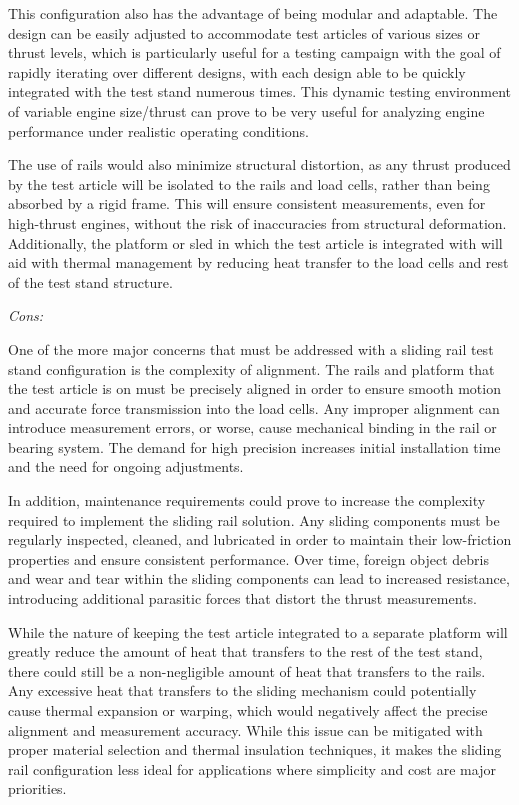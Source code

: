 This configuration also has the advantage of being modular and adaptable. The design can be easily adjusted to accommodate test articles of various sizes or thrust levels, which is particularly useful for a testing campaign with the goal of rapidly iterating over different designs, with each design able to be quickly integrated with the test stand numerous times. This dynamic testing environment of variable engine size/thrust can prove to be very useful for analyzing engine performance under realistic operating conditions.

The use of rails would also minimize structural distortion, as any thrust produced by the test article will be isolated to the rails and load cells, rather than being absorbed by a rigid frame. This will ensure consistent measurements, even for high-thrust engines, without the risk of inaccuracies from structural deformation. Additionally, the platform or sled in which the test article is integrated with will aid with thermal management by reducing heat transfer to the load cells and rest of the test stand structure.

\noindent\textit{Cons:}

One of the more major concerns that must be addressed with a sliding rail test stand configuration is the complexity of alignment. The rails and platform that the test article is on must be precisely aligned in order to ensure smooth motion and accurate force transmission into the load cells. Any improper alignment can introduce measurement errors, or worse, cause mechanical binding in the rail or bearing system. The demand for high precision increases initial installation time and the need for ongoing adjustments.

In addition, maintenance requirements could prove to increase the complexity required to implement the sliding rail solution. Any sliding components must be regularly inspected, cleaned, and lubricated in order to maintain their low-friction properties and ensure consistent performance. Over time, foreign object debris and wear and tear within the sliding components can lead to increased resistance, introducing additional parasitic forces that distort the thrust measurements.

While the nature of keeping the test article integrated to a separate platform will greatly reduce the amount of heat that transfers to the rest of the test stand, there could still be a non-negligible amount of heat that transfers to the rails. Any excessive heat that transfers to the sliding mechanism could potentially cause thermal expansion or warping, which would negatively affect the precise alignment and measurement accuracy. While this issue can be mitigated with proper material selection and thermal insulation techniques, it makes the sliding rail configuration less ideal for applications where simplicity and cost are major priorities.


